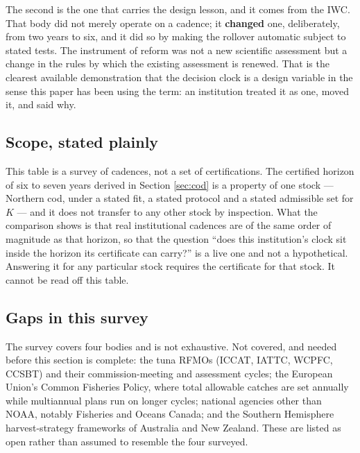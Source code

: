 The second is the one that carries the design lesson, and it comes from the IWC. That body
did not merely operate on a cadence; it \textbf{changed} one, deliberately, from two years
to six, and it did so by making the rollover automatic subject to stated tests. The
instrument of reform was not a new scientific assessment but a change in the rules by which
the existing assessment is renewed. That is the clearest available demonstration that the
decision clock is a design variable in the sense this paper has been using the term: an
institution treated it as one, moved it, and said why.

\subsection{Scope, stated plainly}

This table is a survey of cadences, not a set of certifications. The certified horizon of
six to seven years derived in Section \ref{sec:cod} is a property of one stock --- Northern
cod, under a stated fit, a stated protocol and a stated admissible set for \(K\) --- and it
does not transfer to any other stock by inspection. What the comparison shows is that real
institutional cadences are of the same order of magnitude as that horizon, so that the
question ``does this institution's clock sit inside the horizon its certificate can
carry?'' is a live one and not a hypothetical. Answering it for any particular stock
requires the certificate for that stock. It cannot be read off this table.

\subsection{Gaps in this survey}

The survey covers four bodies and is not exhaustive. Not covered, and needed before this
section is complete: the tuna RFMOs (ICCAT, IATTC, WCPFC, CCSBT) and their
commission-meeting and assessment cycles; the European Union's Common Fisheries Policy,
where total allowable catches are set annually while multiannual plans run on longer
cycles; national agencies other than NOAA, notably Fisheries and Oceans Canada; and the
Southern Hemisphere harvest-strategy frameworks of Australia and New Zealand. These are
listed as open rather than assumed to resemble the four surveyed.
